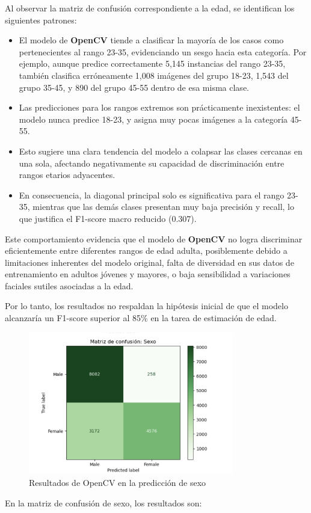 Al observar la matriz de confusión correspondiente a la edad, se identifican los siguientes patrones:

\begin{itemize}
  \item El modelo de \textbf{OpenCV} tiende a clasificar la mayoría de los casos como pertenecientes al rango 23-35, evidenciando un sesgo hacia esta categoría. Por ejemplo, aunque predice correctamente 5,145 instancias del rango 23-35, también clasifica erróneamente 1,008 imágenes del grupo 18-23, 1,543 del grupo 35-45, y 890 del grupo 45-55 dentro de esa misma clase.
  \item Las predicciones para los rangos extremos son prácticamente inexistentes: el modelo nunca predice 18-23, y asigna muy pocas imágenes a la categoría 45-55.
  \item Esto sugiere una clara tendencia del modelo a colapsar las clases cercanas en una sola, afectando negativamente su capacidad de discriminación entre rangos etarios adyacentes.
  \item En consecuencia, la diagonal principal solo es significativa para el rango 23-35, mientras que las demás clases presentan muy baja precisión y recall, lo que justifica el F1-score macro reducido (0.307).
\end{itemize}

Este comportamiento evidencia que el modelo de \textbf{OpenCV} no logra discriminar eficientemente entre diferentes rangos de edad adulta, posiblemente debido a limitaciones inherentes del modelo original, falta de diversidad en sus datos de entrenamiento en adultos jóvenes y mayores, o baja sensibilidad a variaciones faciales sutiles asociadas a la edad.

Por lo tanto, los resultados no respaldan la hipótesis inicial de que el modelo alcanzaría un F1-score superior al 85\% en la tarea de estimación de edad.

\newpage
\begin{figure}[h]
  \centering
  \includegraphics[width=0.8\textwidth]{assets/MatrizConfusionSexo-opencv.png}
  \caption{Resultados de OpenCV en la predicción de sexo}
  \label{fig:opencv_sex_results}
\end{figure}
En la matriz de confusión de sexo, los resultados son:

